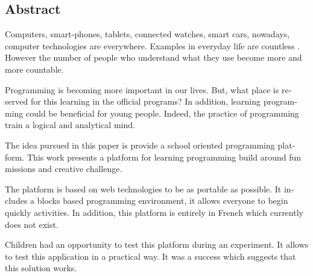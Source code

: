 \begin{otherlanguage}{english}
\section*{Abstract}
Computers, smart-phones, tablets, connected watches, smart cars, nowadays, computer technologies are everywhere. Examples in everyday life are countless . However the number of people who understand what they use become more and more countable.

Programming is becoming more important in our lives. But, what place is reserved for this learning in the official programs? In addition, learning programming could be beneficial for young people. Indeed, the practice of programming train a logical and analytical mind. \ \

The idea pursued in this paper is provide a school oriented programming platform. This work presents a platform for learning programming build around fun missions and creative challenge. \ \

The platform is based on web technologies to be as portable as possible. It includes a blocks based programming environment, it allows everyone to begin quickly activities. In addition, this platform is entirely in French which currently does not exist. \ \

Children had an opportunity to test this platform during an experiment. It allows to test this application in a practical way. It was a success which suggests that this solution works.
\end{otherlanguage}
